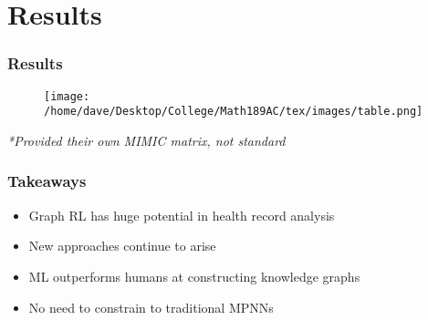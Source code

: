 \documentclass{beamer}
\begin{document}
\section{Results}

\begin{frame}
    \frametitle{Results}
	
	\begin{figure}
        \texttt{[image: /home/dave/Desktop/College/Math189AC/tex/images/table.png]}
    \end{figure}
    \emph{*Provided their own MIMIC matrix, not standard}
    

    \end{frame}


\begin{frame}
    \frametitle{Takeaways}
    
    \begin{itemize}
    	\item Graph RL has huge potential in health record analysis
    	\item New approaches continue to arise
        \item ML outperforms humans at constructing knowledge graphs
        \item No need to constrain to traditional MPNNs
    \end{itemize}
    

    \end{frame}
\end{document}
